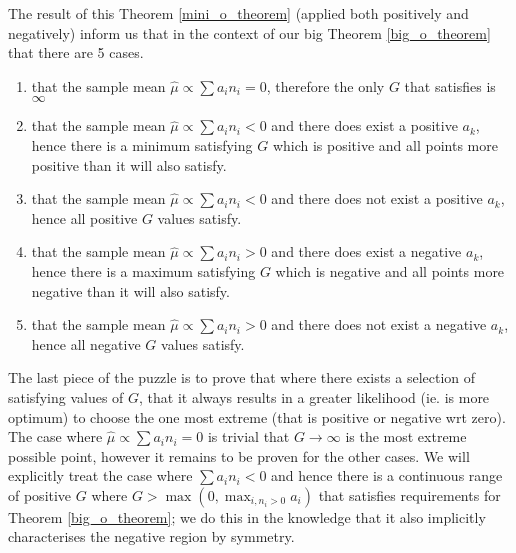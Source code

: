 \documentclass[12pt]{colt2020} %
\begin{document}
The result of this Theorem \ref{mini_o_theorem} (applied both positively and negatively) inform us that in the context of our big Theorem \ref{big_o_theorem} that there are 5 cases.
\begin{enumerate}
\item that the sample mean $\hat{\mu}\propto \sum a_in_i=0$, therefore the only $G$ that satisfies is $\infty$
\item that the sample mean $\hat{\mu}\propto \sum a_in_i<0$ and there does exist a positive $a_k$, hence there is a minimum satisfying $G$ which is positive and all points more positive than it will also satisfy.
\item that the sample mean $\hat{\mu}\propto \sum a_in_i<0$ and there does not exist a positive $a_k$, hence all positive $G$ values satisfy.
\item that the sample mean $\hat{\mu}\propto \sum a_in_i>0$ and there does exist a negative $a_k$, hence there is a maximum satisfying $G$ which is negative and all points more negative than it will also satisfy.
\item that the sample mean $\hat{\mu}\propto \sum a_in_i>0$ and there does not exist a negative $a_k$, hence all negative $G$ values satisfy.
\end{enumerate}

The last piece of the puzzle is to prove that where there exists a selection of satisfying values of $G$, that it always results in a greater likelihood (ie. is more optimum) to choose the one most extreme (that is positive or negative wrt zero).
The case where $\hat{\mu}\propto \sum a_in_i=0$ is trivial that $G\rightarrow \infty$ is the most extreme possible point, however it remains to be proven for the other cases.
We will explicitly treat the case where $\sum a_in_i<0$ and hence there is a continuous range of positive $G$ where $G>\max(0,\max_{i,n_i>0}a_i)$ that satisfies requirements for Theorem \ref{big_o_theorem}; we do this in the knowledge that it also implicitly characterises the negative region by symmetry.
\end{document}
